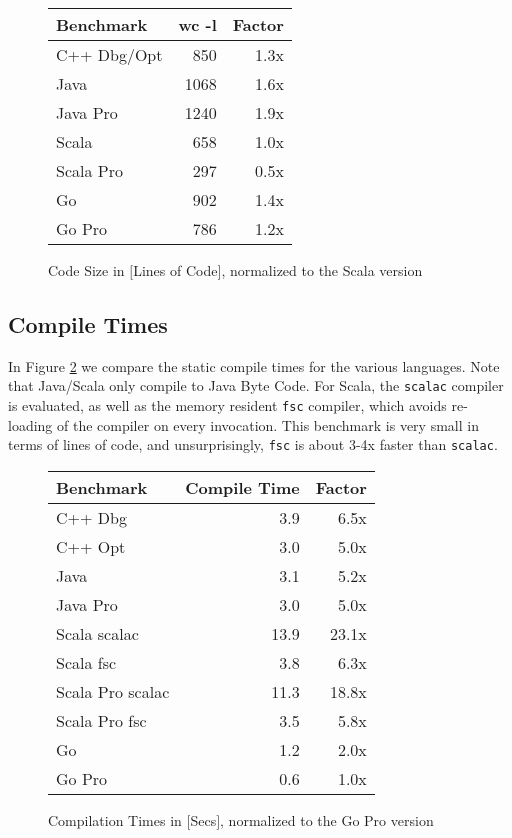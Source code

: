 \begin{figure}
\begin{tabular}{|l|r|r|} \hline
 Benchmark	&wc -l	& Factor  \\ \hline\hline
 C++ Dbg/Opt	&850    & 1.3x	  \\ \hline
 Java 	        &1068	& 1.6x	  \\ \hline
 Java Pro       &1240	& 1.9x	  \\ \hline
 Scala	        &658	& 1.0x	  \\ \hline
 Scala Pro      &297	& 0.5x	  \\ \hline
 Go	        &902	& 1.4x	  \\ \hline
 Go Pro	        &786	& 1.2x	  \\ \hline
\end{tabular}
\caption{Code Size in $[$Lines of Code$]$, normalized to the Scala version}
\label{codesize}
\end{figure}

\subsection{Compile Times}

In Figure \ref{compiletime} we compare the static compile times for
the various languages. Note that Java/Scala only compile to
Java Byte Code. For Scala, the {\tt scalac} compiler is evaluated,
as well as the memory resident {\tt fsc} compiler, which avoids
re-loading of the compiler on every invocation. This benchmark
is very small in terms of lines of code, and unsurprisingly,
{\tt fsc} is about 3-4x faster than {\tt scalac}.

\begin{figure}
\begin{tabular}{|l|r|r|} \hline
 Benchmark    & Compile Time       & Factor \\ \hline\hline
 C++ Dbg      &      3.9           &  6.5x \\ \hline
 C++ Opt      &      3.0           &  5.0x \\ \hline
 Java         &      3.1           &  5.2x \\ \hline
 Java Pro     &      3.0           &  5.0x \\ \hline
 Scala scalac &     13.9           & 23.1x \\ \hline
 Scala fsc    &      3.8           &  6.3x \\ \hline
 Scala Pro scalac & 11.3           & 18.8x \\ \hline
 Scala Pro fsc    &  3.5           &  5.8x \\ \hline
 Go           &      1.2           &  2.0x \\ \hline
 Go Pro       &      0.6           &  1.0x \\ \hline
\end{tabular}
\caption{Compilation Times in $[$Secs$]$, normalized to the Go Pro version}
\label{compiletime}
\end{figure}



